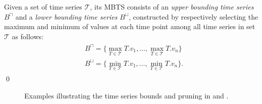 \begin{mydefinition} 
Given a set of time series $\mathcal{T}$, its MBTS consists of an \emph{upper bounding time series} $B^{\sqcap}$ and a \emph{lower bounding time series} $B^{\sqcup}$, constructed by respectively selecting the maximum and minimum of values at each time point among all time series in set $\mathcal{T}$ as follows:
\begin{align}\label{eq:bounds}
 \begin{split}
  & B^{\sqcap} = \{ \max_{T \in \mathcal{T}} T.v_1, \ldots, \max_{T \in \mathcal{T}} T.v_{n} \} \\
  & B^{\sqcup} = \{ \min_{T \in \mathcal{T}} T.v_1, \ldots, \min_{T \in \mathcal{T}} T.v_{n} \}.
 \end{split}
\end{align}
\qed
\end{mydefinition}

\begin{figure}[!tb]
 \centering
 \hspace{8pt}
 \hspace{8pt}
\caption{Examples illustrating the time series bounds and pruning in \tsr and \btsr.}
\label{fig:example_bounds}
\end{figure}

